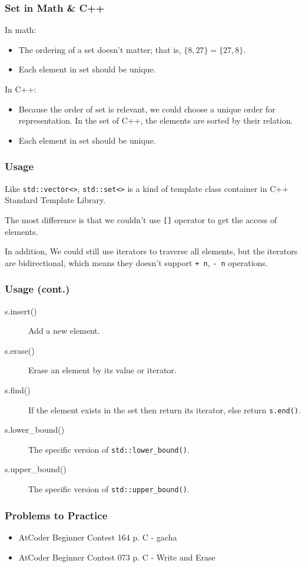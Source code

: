 \documentclass{beamer}
\begin{document}
\frame
{
	\frametitle{Set in Math \& C++}
	
	In math:
	\begin{itemize}
		\item<1-> The ordering of a set doesn't matter; that is, $\{8, 27\} = \{27, 8\}$.
		\item<2-> Each element in set should be unique.
	\end{itemize}
	
	In C++:
	\begin{itemize}
		\item<1-> Because the order of set is relevant, we could choose a unique order for representation. In the set of C++, the elements are sorted by their relation.
		\item<2-> Each element in set should be unique.
	\end{itemize}
}

\frame
{
	\frametitle{Usage}
	
	Like \texttt{std::vector<>}, \texttt{std::set<>} is a kind of template class container in C++ Standard Template Library.
	
	The most difference is that we couldn't use \texttt{[]} operator to get the access of elements.
	
	In addition, We could still use iterators to traverse all elements, but the iterators are bidirectional, which means they doesn't support \texttt{+ n}, \texttt{- n} operations.
}

\frame
{
	\frametitle{Usage (cont.)}
	
	\begin{description}
		\item[\ttfamily s.insert()] Add a new element.
		\item[\ttfamily s.erase()] Erase an element by its value or iterator.
		\item[\ttfamily s.find()] If the element exists in the set then return its iterator, else return \texttt{s.end()}.
		\item[\ttfamily s.lower\_bound()] The specific version of \texttt{std::lower\_bound()}.
		\item[\ttfamily s.upper\_bound()] The specific version of \texttt{std::upper\_bound()}.
	\end{description}
}

\frame
{
	\frametitle{Problems to Practice}
	
	\begin{itemize}
		\item AtCoder Beginner Contest 164 p. C - gacha
		\item AtCoder Beginner Contest 073 p. C - Write and Erase
	\end{itemize}
}
\end{document}

